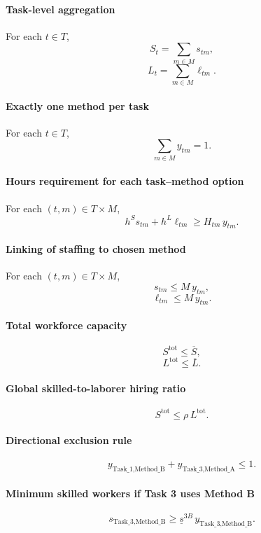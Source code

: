 \paragraph{Task-level aggregation}
For each $t \in T$,
\[
S_t = \sum_{m\in M} s_{tm},
\]
\[
L_t = \sum_{m\in M} \ell_{tm}.
\]

\paragraph{Exactly one method per task}
For each $t \in T$,
\[
\sum_{m\in M} y_{tm} = 1.
\]

\paragraph{Hours requirement for each task--method option}
For each $(t,m)\in T\times M$,
\[
h^S s_{tm} + h^L \ell_{tm} \ge H_{tm}\, y_{tm}.
\]

\paragraph{Linking of staffing to chosen method}
For each $(t,m)\in T\times M$,
\[
s_{tm} \le M\, y_{tm},
\]
\[
\ell_{tm} \le M\, y_{tm}.
\]

\paragraph{Total workforce capacity}
\[
S^{\mathrm{tot}} \le \overline S,
\]
\[
L^{\mathrm{tot}} \le \overline L.
\]

\paragraph{Global skilled-to-laborer hiring ratio}
\[
S^{\mathrm{tot}} \le \rho\, L^{\mathrm{tot}}.
\]

\paragraph{Directional exclusion rule}
\[
y_{\text{Task\_1},\text{Method\_B}} + y_{\text{Task\_3},\text{Method\_A}} \le 1.
\]

\paragraph{Minimum skilled workers if Task 3 uses Method B}
\[
s_{\text{Task\_3},\text{Method\_B}}
\ge
\underline s^{3B}\, y_{\text{Task\_3},\text{Method\_B}}.
\]

